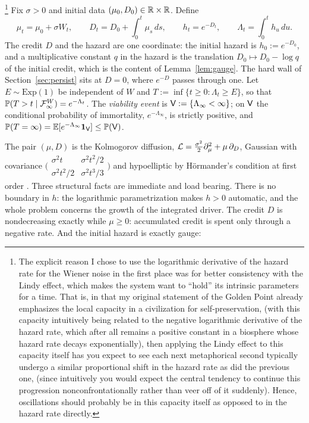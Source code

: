 \begin{definition}\label{def:model}\footnote{The explicit reason I chose to use the logarithmic derivative of the
hazard rate for the Wiener noise in the first place was for better consistency
with the Lindy effect, which makes the system want to ``hold'' its intrinsic
parameters for a time. That is, in that my original statement of the Golden
Point already emphasizes the local capacity in a civilization for
self-preservation, (with this capacity intuitively being related to the
negative logarithmic derivative of the hazard rate, which after all remains a
positive constant in a biosphere whose hazard rate decays exponentially), then
applying the Lindy effect to this capacity itself has you expect to see each
next metaphorical second typically undergo a similar proportional shift in the
hazard rate as did the previous one, (since intuitively you would expect the
central tendency to continue this progression nonconfrontationally rather than
veer off of it suddenly). Hence, oscillations should probably be in this
capacity itself as opposed to in the hazard rate directly.}
Fix $\sigma>0$ and initial data $(\mu_0,D_0)\in\mathbb{R}\times\mathbb{R}$. Define
\begin{equation}\label{eq:model}
\mu_t=\mu_0+\sigma W_t,\qquad
D_t=D_0+\int_0^t\mu_s\,ds,\qquad
h_t=e^{-D_t},\qquad
\Lambda_t=\int_0^t h_u\,du .
\end{equation}
The credit $D$ and the hazard are one coordinate: the initial hazard
is $h_0:=e^{-D_0}$, and a multiplicative constant $q$ in the hazard
is the translation $D_0\mapsto D_0-\log q$ of the initial credit,
which is the content of Lemma~\ref{lem:gauge}. The hard wall of
Section~\ref{sec:persist} sits at $D=0$, where $e^{-D}$ passes
through one.
Let $E\sim\mathrm{Exp}(1)$ be independent of $W$ and
$T:=\inf\{t\ge0:\Lambda_t\ge E\}$, so that
$\mathbb{P}(T>t\mid\mathcal{F}^W_\infty)=e^{-\Lambda_t}$. The \emph{viability event}
is $\mathsf{V}:=\{\Lambda_\infty<\infty\}$; on $\mathsf{V}$ the conditional
probability of immortality, $e^{-\Lambda_\infty}$, is strictly
positive, and
$\mathbb{P}(T=\infty)=\mathbb{E}[e^{-\Lambda_\infty}\mathbf{1}_{\mathsf{V}}]\le\mathbb{P}(\mathsf{V})$.
\end{definition}

The pair $(\mu,D)$ is the Kolmogorov diffusion,
$\mathcal{L}=\tfrac{\sigma^2}{2}\partial_\mu^2+\mu\,\partial_D$, Gaussian with
covariance
$\bigl(\begin{smallmatrix}\sigma^2t&\sigma^2t^2/2\\
\sigma^2t^2/2&\sigma^2t^3/3\end{smallmatrix}\bigr)$
and hypoelliptic by H\"ormander's condition at first order
\cite{Kol34,Hor67}. Three structural facts are immediate and load
bearing. There is no boundary in $h$: the logarithmic parametrization
makes $h>0$ automatic, and the whole problem concerns the growth of
the integrated driver. The credit $D$ is nondecreasing exactly while
$\mu\ge0$: accumulated credit is spent only through a negative rate.
And the initial hazard is exactly gauge:


